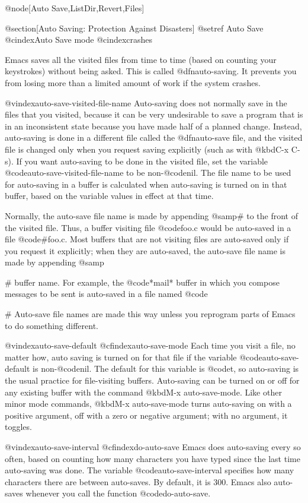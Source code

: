 {{{{{{{{{{{{{{{{{{@node[Auto Save,ListDir,Revert,Files]

@section[Auto Saving: Protection Against Disasters]
@setref Auto Save
@cindex{Auto Save mode}
@cindex{crashes}

  Emacs saves all the visited files from time to time (based on counting
your keystrokes) without being asked.  This is called @dfn{auto-saving}.
It prevents you from losing more than a limited amount of work if the
system crashes.

@vindex{auto-save-visited-file-name}
  Auto-saving does not normally save in the files that you visited, because
it can be very undesirable to save a program that is in an inconsistent
state because you have made half of a planned change.  Instead, auto-saving
is done in a different file called the @dfn{auto-save file}, and the
visited file is changed only when you request saving explicitly (such as
with @kbd{C-x C-s}).  If you want auto-saving to be done in the visited file,
set the variable @code{auto-save-visited-file-name} to be non-@code{nil}.
The file name to be used for auto-saving in a buffer is calculated when
auto-saving is turned on in that buffer, based on the variable values in
effect at that time.

  Normally, the auto-save file name is made by appending @samp{#} to the
front of the visited file.  Thus, a buffer visiting file @code{foo.c} would
be auto-saved in a file @code{#foo.c}.  Most buffers that are not visiting
files are auto-saved only if you request it explicitly; when they are
auto-saved, the auto-save file name is made by appending @samp{#%
buffer name.  For example, the @code{*mail*} buffer in which you compose
messages to be sent is auto-saved in a file named @code{#%
Auto-save file names are made this way unless you reprogram parts of Emacs
to do something different.

@vindex{auto-save-default}
@cfindex{auto-save-mode}
  Each time you visit a file, no matter how, auto saving is turned on for
that file if the variable @code{auto-save-default} is non-@code{nil}.  The
default for this variable is @code{t}, so auto-saving is the usual practice
for file-visiting buffers.  Auto-saving can be turned on or off for any
existing buffer with the command @kbd{M-x auto-save-mode}.  Like other
minor mode commands, @kbd{M-x auto-save-mode} turns auto-saving on with a
positive argument, off with a zero or negative argument; with no argument,
it toggles.

@vindex{auto-save-interval}
@cfindex{do-auto-save}
  Emacs does auto-saving every so often, based on counting how many
characters you have typed since the last time auto-saving was done.  The
variable @code{auto-save-interval} specifies how many characters there are
between auto-saves.  By default, it is 300.  Emacs also auto-saves whenever
you call the function @code{do-auto-save}.

}}}}}}}}}}}}}}}}}}}}
